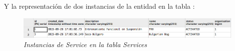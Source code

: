 Y la representación de dos instancias de la entidad  en la tabla :

\begin{figure}[H]
\centering
  \includegraphics[scale=.50]{img/services-rows.jpg}
  \caption{\textit{Instancias de Service en la tabla Services}}
  \label{fig:services-rows}
\end{figure}












